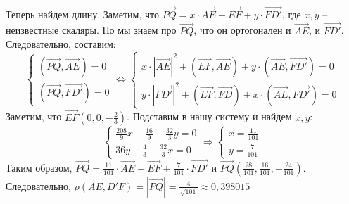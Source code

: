 \documentclass[a4paper, 12pt]{article}
\begin{document}
\begin{spacing}{1}
\begin{gather*}
\end{gather*}
Теперь найдем длину. Заметим, что $\overrightarrow{PQ} = x\cdot \overrightarrow{AE} + \overrightarrow{EF} + y \cdot \overrightarrow{FD'}$, где $x, y$ -- неизвестные скаляры. Но мы знаем про $\overrightarrow{PQ}$, что он ортогонален и $\overrightarrow{AE}$, и $\overrightarrow{FD'}$. Следовательно, составим:
$$
\begin{cases}
	(\overrightarrow{PQ}, \overrightarrow{AE}) = 0\\
	(\overrightarrow{PQ}, \overrightarrow{FD'}) = 0
\end{cases} \Leftrightarrow
\begin{cases}
	x \cdot |\overrightarrow{AE}|^2 + (\overrightarrow{EF}, \overrightarrow{AE}) + y\cdot (\overrightarrow{AE}, \overrightarrow{FD'}) = 0 \\
	y \cdot |\overrightarrow{FD'}|^2 + (\overrightarrow{EF}, \overrightarrow{FD}) + x\cdot (\overrightarrow{AE}, \overrightarrow{FD'}) = 0 
\end{cases}
$$
Заметим, что $\overrightarrow{EF}(0, 0, -\frac{2}{3})$. Подставим в нашу систему и найдем $x, y$:
$$
\begin{cases}
	\frac{208}{9}x - \frac{16}{9} - \frac{32}{3}y = 0\\
	36y - \frac{4}{3}-\frac{32}{3}x = 0 
\end{cases} \Rightarrow
\begin{cases}
	x = \frac{11}{101}\\y = \frac{7}{101}
\end{cases}
$$
Таким образом, $\overrightarrow{PQ} = \frac{11}{101}\cdot \overrightarrow{AE} + \overrightarrow{EF} + \frac{7}{101}\cdot \overrightarrow{FD'}$ и $\overrightarrow{PQ}(\frac{28}{101}, \frac{16}{101}, -\frac{24}{101})$. Следовательно, $\rho(AE, D'F) = |\overrightarrow{PQ}| = \frac{4}{\sqrt{101}} \approx 0,398015$\\










\end{spacing}
\end{document}

